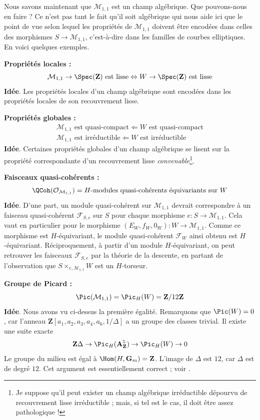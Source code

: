 \noindent
Nous savons maintenant que $\mathcal{M}_{1, 1}$ est un champ algébrique.
Que pouvons-nous en faire ? Ce n'est pas tant le fait qu'il soit algébrique
qui nous aide ici que le point de vue selon lequel les propriétés de
$\mathcal{M}_{1, 1}$ doivent être encodées dans celles des morphismes
$S \to \mathcal{M}_{1, 1}$, c'est-à-dire dans les familles de courbes
elliptiques. En voici quelques exemples.

\medskip\noindent
{\bf Propriétés locales :}
$$
\mathcal{M}_{1, 1} \to \Spec(\mathbf{Z})\text{ est lisse}
\Leftrightarrow
W \to \Spec(\mathbf{Z})\text{ est lisse}
$$
{\bf Idée}. Les propriétés locales d'un champ algébrique sont encodées dans
les propriétés locales de son recouvrement lisse.

\medskip\noindent
{\bf Propriétés globales :}
$$
\begin{matrix}
\mathcal{M}_{1, 1}\text{ est quasi-compact} \Leftarrow W\text{ est quasi-compact}
\\
\mathcal{M}_{1, 1}\text{ est irréductible} \Leftarrow W\text{ est irréductible}
\end{matrix}
$$
{\bf Idée}. Certaines propriétés globales d'un champ algébrique se lisent sur
la propriété correspondante d'un recouvrement lisse
{\it convenable}\footnote{Je suppose qu'il peut exister un champ algébrique
irréductible dépourvu de recouvrement lisse irréductible ; mais, si tel est le
cas, il doit être assez pathologique !}.

\medskip\noindent
{\bf Faisceaux quasi-cohérents :}
$$
\QCoh(\mathcal{O}_{\mathcal{M}_{1, 1}}) =
H\text{-modules quasi-cohérents équivariants sur }W
$$
{\bf Idée}. D'une part, un module quasi-cohérent sur
$\mathcal{M}_{1, 1}$ devrait correspondre à un faisceau quasi-cohérent
$\mathcal{F}_{S, e}$ sur $S$ pour chaque morphisme
$e : S \to \mathcal{M}_{1, 1}$. Cela vaut en particulier pour le morphisme
$(E_W, f_W, 0_W) :  W \to \mathcal{M}_{1, 1}$. Comme ce morphisme est
$H$-équivariant, le module quasi-cohérent $\mathcal{F}_W$ ainsi obtenu est
$H$-équivariant. Réciproquement, à partir d'un module $H$-équivariant, on peut
retrouver les faisceaux $\mathcal{F}_{S, e}$ par la théorie de la descente, en
partant de l'observation que $S \times_{e, \mathcal{M}_{1, 1}} W$ est un
$H$-torseur.

\medskip\noindent
{\bf Groupe de Picard :}
$$
\Pic(\mathcal{M}_{1, 1}) = \Pic_H(W) = \mathbf{Z}/12\mathbf{Z}
$$
{\bf Idée}. Nous avons vu ci-dessus la première égalité. Remarquons que
$\Pic(W) = 0$, car l'anneau
$\mathbf{Z}[a_1, a_2, a_3, a_4, a_6, 1/\Delta]$
a un groupe des classes trivial. Il existe une suite exacte
$$
\mathbf{Z}\Delta \to
\Pic_H(\mathbf{A}^5_{\mathbf{Z}}) \to
\Pic_H(W) \to 0
$$
Le groupe du milieu est égal à $\Hom(H, \mathbf{G}_m) = \mathbf{Z}$.
L'image de $\Delta$ est $12$, car $\Delta$ est de degré $12$.
Cet argument est essentiellement correct ; voir \cite{PicM11}.

